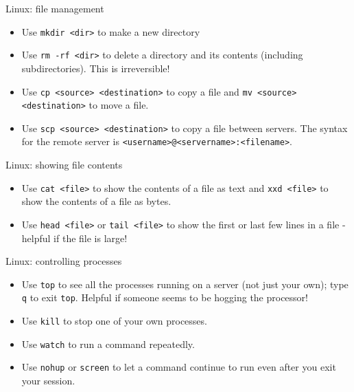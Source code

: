 \documentclass{beamer}
\newcommand{\command}[1]{\colorbox{light-gray}{\texttt{#1}}}
\newcommand{\filename}[1]{\colorbox{light-green}{\texttt{#1}}}
\begin{document}
\begin{frame}{Linux: file management}
  \begin{itemize}
  \item Use \command{mkdir <dir>} to make a new directory
  \item Use \command{rm -rf <dir>} to delete a directory and its contents (including subdirectories). This is irreversible!
  \item Use \command{cp <source> <destination>} to copy a file and \command{mv <source> <destination>} to move a file.
  \item Use \command{scp <source> <destination>} to copy a file between servers. The syntax for the remote server is \filename{<username>@<servername>:<filename>}.
  \end{itemize}
\end{frame}

\begin{frame}{Linux: showing file contents}
  \begin{itemize}
  \item Use \command{cat <file>} to show the contents of a file as text and \command{xxd <file>} to show the contents of a file as bytes.
  \item Use \command{head <file>} or \command{tail <file>} to show the first or last few lines in a file - helpful if the file is large!
  \end{itemize}
\end{frame}

\begin{frame}{Linux: controlling processes}
  \begin{itemize}
  \item Use \command{top} to see all the processes running on a server (not just your own); type \command{q} to exit \command{top}. Helpful if someone seems to be hogging the processor!
  \item Use \command{kill} to stop one of your own processes.
  \item Use \command{watch} to run a command repeatedly.
  \item Use \command{nohup} or \command{screen} to let a command continue to run even after you exit your session.
  \end{itemize}
\end{frame}
\end{document}
